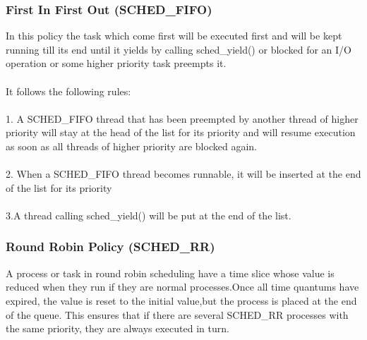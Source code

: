 \documentclass[a4paper]{article}
\begin{document}
\subsubsection{First In First Out (SCHED\_FIFO)}
In this policy the task which come first will be executed first and will be kept running till its end until it yields by calling sched\_yield() or blocked for an I/O operation or some higher priority task preempts it.\\ \\
It follows the following rules:\\ \\
\hspace*{5mm}1. A SCHED\_FIFO thread that has been preempted by another thread of
          higher priority will stay at the head of the list for its priority
          and will resume execution as soon as all threads of higher
          priority are blocked again.\\ \\
\hspace*{5mm}2. When a SCHED\_FIFO thread becomes runnable, it will be inserted at the end of the list for its priority\\ \\
\hspace*{5mm}3.A thread calling sched\_yield() will be put at the end of the
          list.
\\
\subsubsection{Round Robin Policy (SCHED\_RR) }
A process or task in round robin scheduling have a time slice whose value is reduced when they run if they are normal processes.Once all time quantums have expired, the value is reset to the initial value,but the process is placed at the end of the queue. This ensures that if there are several SCHED\_RR processes with the same priority, they are always executed in turn.
    
\end{document}
